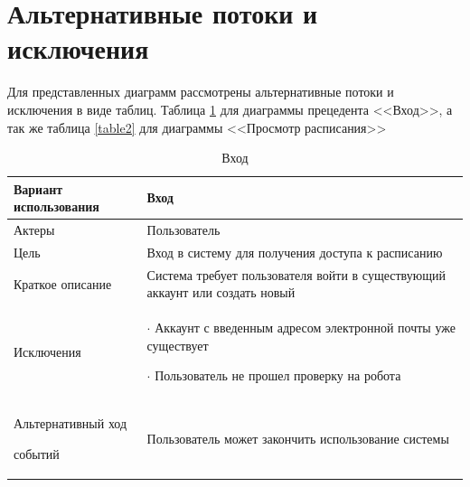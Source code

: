 \documentclass[14pt]{extreport}
\begin{document}
\section{Альтернативные потоки и исключения}
Для представленных диаграмм рассмотрены альтернативные потоки и исключения в виде таблиц. Таблица \ref{table1} для диаграммы прецедента <<Вход>>, а так же таблица \ref{table2} для диаграммы <<Просмотр расписания>>

\begin{table}[H]

    \begin{center}
    \caption{Вход \label{table1}}
    \begin{tabular}{|p{5.5cm}|p{10.7cm}|}
    \hline
    Вариант использования & Вход \\
    \hline
    Актеры
     & Пользователь
     \\
    \hline
    Цель
     & Вход в систему для получения доступа к расписанию 
     \\
    \hline
    Краткое описание
     & Система требует пользователя войти в существующий аккаунт или создать новый 
     \\
    \hline
    Исключения
     & 
    $\cdot$ Аккаунт с введенным адресом электронной почты уже существует 
    
    $\cdot$ Пользователь не прошел проверку на робота 
     \\
    \hline
    Альтернативный ход 
    
    событий
    & Пользователь может закончить использование системы \\
    
    \hline
    \end{tabular}
    \end{center}
    \end{table}
\end{document}
